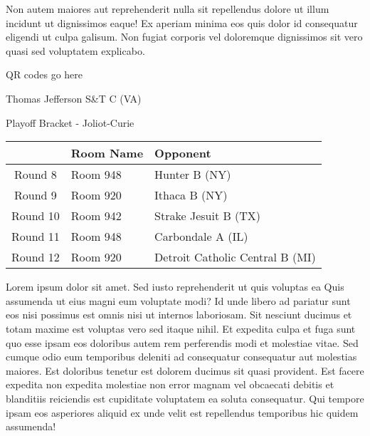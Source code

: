 \documentclass{article}%
\begin{document}
\newline%
Non autem maiores aut reprehenderit nulla sit repellendus dolore ut illum incidunt ut dignissimos eaque! Ex aperiam minima eos quis dolor id consequatur eligendi ut culpa galisum. Non fugiat corporis vel doloremque dignissimos sit vero quasi sed voluptatem explicabo.\newline%
\newline%
%
\vspace*{30pt}%
\begin{center}%
\begin{Huge}%
QR codes go here%
\end{Huge}%
\end{center}%
\newpage%
\begin{center}%
\begin{Huge}%
Thomas Jefferson S\&T C (VA)%
\end{Huge}%
\vspace*{8pt}%
\linebreak%
\begin{Large}%
Playoff Bracket {-} Joliot{-}Curie%
\end{Large}%
\end{center}%
\begin{tabularx}{\textwidth}{|c|Y|Y|}%
\hline%
&Room Name&Opponent\\%
\hline%
Round 8&Room 948&Hunter B (NY)\\%
Round 9&Room 920&Ithaca B (NY)\\%
Round 10&Room 942&Strake Jesuit B (TX)\\%
Round 11&Room 948&Carbondale A (IL)\\%
Round 12&Room 920&Detroit Catholic Central B (MI)\\%
\hline%
\end{tabularx}%
\vspace*{8pt}%
\linebreak%
\newline%
\newline%
Lorem ipsum dolor sit amet. Sed iusto reprehenderit ut quis voluptas ea Quis assumenda ut eius magni eum voluptate modi? Id unde libero ad pariatur sunt eos nisi possimus est omnis nisi ut internos laboriosam. Sit nesciunt ducimus et totam maxime est voluptas vero sed itaque nihil. Et expedita culpa et fuga sunt quo esse ipsam eos doloribus autem rem perferendis modi et molestiae vitae.\newline%
\newline%
Sed cumque odio eum temporibus deleniti ad consequatur consequatur aut molestias maiores. Est doloribus tenetur est dolorem ducimus sit quasi provident. Est facere expedita non expedita molestiae non error magnam vel obcaecati debitis et blanditiis reiciendis est cupiditate voluptatem ea soluta consequatur. Qui tempore ipsam eos asperiores aliquid ex unde velit est repellendus temporibus hic quidem assumenda!\newline%
\end{document}
